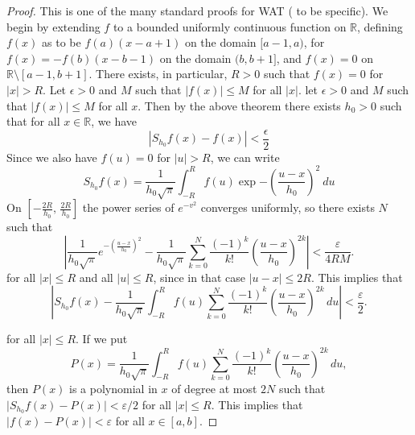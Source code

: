\begin{proof}
    This is one of the many standard proofs for WAT (\cite{Schep2007} to be specific). We begin by extending $f$ to a bounded uniformly continuous function on $\mathbb{R}$, defining $f(x)$ as to be $f(a)(x-a+1)$ on the domain $[a-1,a)$, for $f(x)=-f(b)(x-b-1)$ on the domain $(b,b+1]$, and $f(x)=0$ on $\mathbb{R}\setminus [a-1,b+1]$. There exists, in particular, $R>0$ such that $f(x)=0$ for $|x|>R$. Let $\epsilon>0$ and $M$ such that $|f(x)|\leq M$ for all $|x|$. let $\epsilon > 0$ and $M$ such that $|f(x)|\leq M$ for all $x$. Then by the above theorem there exists $h_{0}>0$ such that for all $x\in\mathbb{R}$, we have 
    \begin{equation}
        |S_{h_{0}}f(x)-f(x)| < \frac{\epsilon}{2}
    \end{equation}
    Since we also have $f(u)=0$ for $|u|>R$, we can write 
    \begin{equation}
        S_{h_{0}}f(x) = \frac{1}{h_{0}\sqrt{\pi}} \int^{R}_{-R} f(u)\exp{-\left(\frac{u-x}{h_{0}}\right)^{2}} \: du
    \end{equation}
    On $\left[-\frac{2R}{h_0},\, \frac{2R}{h_0}\right]$ the power series of $e^{-v^2}$ 
converges uniformly, so there exists $N$ such that
\begin{equation}
\left|
\frac{1}{h_0\sqrt{\pi}} e^{-\left(\frac{u-x}{h_0}\right)^2}
-
\frac{1}{h_0\sqrt{\pi}}
\sum_{k=0}^{N} \frac{(-1)^k}{k!}
\left( \frac{u-x}{h_0} \right)^{2k}
\right|
< \frac{\varepsilon}{4RM}.
\end{equation}
for all $\lvert x\rvert \le R$ and all $\lvert u\rvert \le R$, since in that case 
$\lvert u-x\rvert \le 2R$.  
This implies that
\begin{equation}
    \left|
    S_{h_0} f(x)
    -
    \frac{1}{h_0\sqrt{\pi}}
    \int_{-R}^{R}
    f(u)
    \sum_{k=0}^{N} \frac{(-1)^k}{k!}
    \left( \frac{u-x}{h_0} \right)^{2k}
    \, du
    \right|
    < \frac{\varepsilon}{2}.
    \end{equation}

    for all $\lvert x\rvert \le R$.  
    If we put
    \begin{equation}
    P(x)
    =
    \frac{1}{h_0\sqrt{\pi}}
    \int_{-R}^{R}
    f(u)
    \sum_{k=0}^{N} \frac{(-1)^k}{k!}
    \left( \frac{u-x}{h_0} \right)^{2k}
    \, du,
\end{equation}
    then $P(x)$ is a polynomial in $x$ of degree at most $2N$ such that $\lvert S_{h_0} f(x) - P(x) \rvert < \varepsilon/2$ for all $\lvert x\rvert \le R$. This implies that $\lvert f(x) - P(x) \rvert < \varepsilon$ for all $x \in [a,b]$.
\end{proof}

